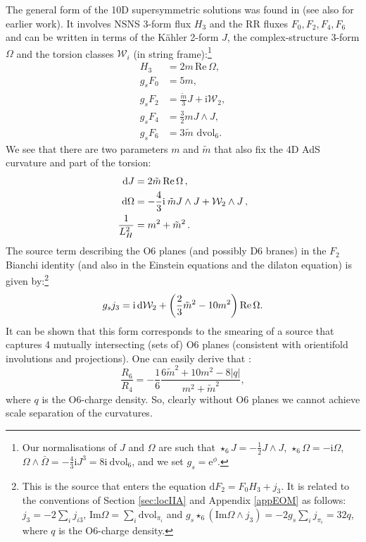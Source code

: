 \documentclass[11pt]{article}
\newcommand{\be}{\begin{equation}}
\newcommand{\ee}{\end{equation}}
\def\be{\begin{equation}}
\def\ee{\end{equation}}
\renewcommand{\[}{\left[}
\renewcommand{\]}{\right]}
\renewcommand{\(}{\left(}
\renewcommand{\)}{\right)}
\newcommand{\w}{\wedge}
\renewcommand{\Re}{\text{Re}\,}
\renewcommand{\d}{\textrm{d}}
\newcommand{\rmi}{\textrm{i}}
\newcommand{\e}{\textrm{e}}
\newcommand{\dd}{\mathrm{d}}
\newcommand{\<}{\langle}
\renewcommand{\>}{\rangle}
\begin{document}
The general form of the 10D supersymmetric solutions was found in \cite{Lust:2004ig, Grana:2006kf} (see also \cite{Behrndt:2004mj} for earlier work). It involves NSNS 3-form flux $H_3$ and the RR fluxes $F_0,F_2, F_4, F_6$ and can be written in terms of the K\"ahler 2-form $J$,  the complex-structure 3-form $\Omega$ and the torsion classes $\mathcal{W}_i$ (in string frame):\footnote{Our normalisations of $J$ and $\Omega$ are such that $\star_6 J = - \frac{1}{2} J \wedge J$, $\star_6 \Omega = - \rmi \Omega$, $\Omega \wedge \bar{\Omega} =- \frac{4}{3}\rmi J^3 = 8 \rmi~\text{dvol}_6$, and we set $g_s=\e^{\phi}$.}
\begin{align}
\label{eq:H}
H_3 &= 2m   \, \Re \Omega,\\
\label{eq:F0}
g_s F_0 &= 5 m,\\
\label{eq:F2}
g_s F_2 &= \frac{\tilde{m}}{3} J + \rmi \mathcal{W}_2,\\
\label{eq:F4}
g_s F_4 &= \frac{3}{2} m J \wedge J,\\
\label{eq:F6}
g_s F_6 &=  3\tilde{m} \text{ dvol}_6.
\end{align}
We see that there are two parameters $m$ and $\tilde{m}$ that also fix the 4D AdS curvature and part of the torsion:
\begin{align}
\label{eq:dJ}
 \dd J &= 2 \tilde{m} \, \Re \Omega\,,\\
\label{eq:dOmega}
\d \Omega &= -\frac{4}{3} {\rm i}\: \tilde{m} J \wedge J + \mathcal{W}_2 \wedge J\,,\\
 \frac{1}{L_{H}^2} &= m^2 + \tilde{m}^2\,.
\end{align}
The source term describing the O6 planes (and possibly D6 branes) in the $F_2$ Bianchi identity (and also in the Einstein equations and the dilaton equation) is given by:\footnote{This is the source that enters the equation $\d F_2=F_0H_3+j_3$. It is related to the conventions of Section \ref{sec:locIIA} and Appendix \ref{appEOM} as follows: $j_3=-2\sum_i j_{i3}$, $\text{Im}\Omega = \sum_i \text{dvol}_{\pi_i}$ and $g_s \star_6 (\text{Im}\Omega \w j_3)= -2g_s \sum_i j_{\pi_i}=32q$, where
$q$ is the O6-charge density.}
\be
g_sj_3 = {\rm i}\,\d\mathcal{W}_2 +\left(\frac 23 \tilde m^2 - 10 m^2\right)\Re \Omega. \label{j3}
\ee
It can be shown that this form corresponds to the smearing of a source that captures 4 mutually intersecting (sets of) O6 planes \cite{Caviezel:2008ik} (consistent with orientifold involutions and projections). One can easily derive that \cite{Tsimpis:2012tu, Petrini:2013ika}:
\begin{equation}
\frac{R_6}{R_4} =-\frac{1}{6} \frac{6\tilde{m}^2+10 m^2 - 8|q|}{m^2+\tilde{m}^2},
\end{equation}
where $q$ is the O6-charge density. So, clearly without O6 planes we cannot achieve scale separation of the curvatures.  
\end{document}
